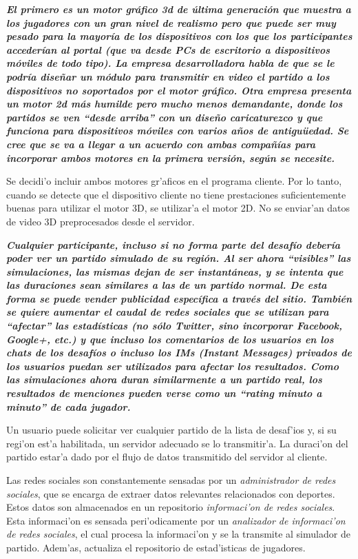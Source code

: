 \textbf{\textit{
El primero es un motor gráfico 3d de última generación que muestra a los jugadores con un gran nivel de realismo pero que puede ser muy pesado para la mayoría de los dispositivos con los que los participantes accederían al portal (que va desde PCs de escritorio a dispositivos móviles de todo tipo). La empresa desarrolladora habla de que se le podría diseñar un módulo para transmitir en video el partido a los dispositivos no soportados por el motor gráfico. Otra empresa presenta un motor 2d más humilde pero mucho menos demandante, donde los partidos se ven “desde arriba” con un diseño caricaturezco y que funciona para dispositivos móviles con varios años de antigu\"uedad. Se cree que se va a llegar a un acuerdo con ambas compañías para incorporar ambos motores en la primera versión, según se necesite.
}}

Se decidi'o incluir ambos motores gr'aficos en el programa cliente. Por lo tanto, cuando se detecte que el dispositivo cliente no tiene prestaciones suficientemente buenas para utilizar el motor 3D, se utilizar'a el motor 2D. No se enviar'an datos de video 3D preprocesados desde el servidor.

\textbf{\textit{
Cualquier participante, incluso si no forma parte del desafío debería poder ver un partido simulado de su región. Al ser ahora “visibles” las simulaciones, las mismas dejan de ser instantáneas, y se intenta que las duraciones sean similares a las de un partido normal. De esta forma se puede vender publicidad específica a través del sitio. También se quiere aumentar el caudal de redes sociales que se utilizan para “afectar” las estadísticas (no sólo Twitter, sino incorporar Facebook, Google+, etc.) y que incluso los comentarios de los usuarios en los chats de los desafíos o incluso los IMs (Instant Messages) privados de los usuarios puedan ser utilizados para afectar los resultados. Como las simulaciones ahora duran similarmente a un partido real, los resultados de menciones pueden verse como un “rating minuto a minuto” de cada jugador.
}}

Un usuario puede solicitar ver cualquier partido de la lista de desaf'ios y, si su regi'on est'a habilitada, un servidor adecuado se lo transmitir'a. La duraci'on del partido estar'a dado por el flujo de datos transmitido del servidor al cliente.

Las redes sociales son constantemente sensadas por un \textit{administrador de redes sociales}, que se encarga de extraer datos relevantes relacionados con deportes. Estos datos son almacenados en un repositorio \textit{informaci'on de redes sociales}. Esta informaci'on es sensada peri'odicamente por un \textit{analizador de informaci'on de redes sociales}, el cual procesa la informaci'on y se la transmite al simulador de partido. Adem'as, actualiza el repositorio de estad'isticas de jugadores.

